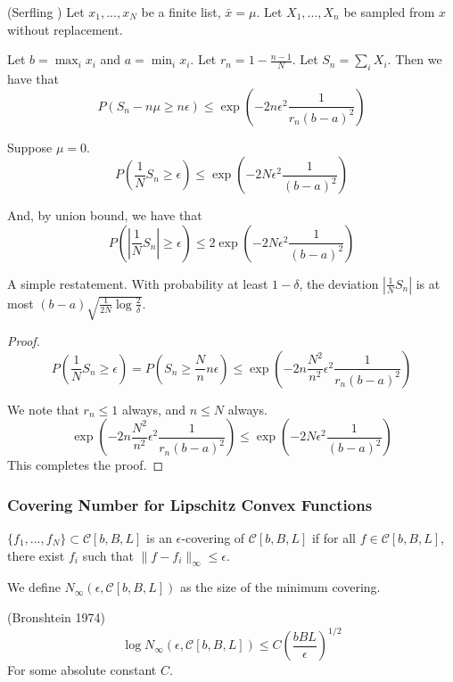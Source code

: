 \begin{lemma} (Serfling \cite{serfling1974probability}) 
Let $x_1,..., x_N$ be a finite list, $\bar{x} = \mu$. Let $X_1,...,X_n$ be sampled from $x$ without replacement. 

Let $b = \max_i x_i$ and $a = \min_i x_i$. Let $r_n = 1- \frac{n-1}{N}$. Let $S_n = \sum_i X_i$.
Then we have that
\[
P( S_n - n \mu \geq n \epsilon) \leq \exp( - 2 n \epsilon^2 \frac{1}{r_n (b-a)^2})
\]
\end{lemma}

\begin{corollary}
\label{cor:serfling}
Suppose $\mu = 0$. 
\[
P( \frac{1}{N} S_n \geq \epsilon) \leq \exp( -2 N \epsilon^2 \frac{1}{(b-a)^2})
\]

And, by union bound, we have that
\[
P( | \frac{1}{N} S_n| \geq \epsilon) \leq 2 \exp( -2 N \epsilon^2 \frac{1}{(b-a)^2})
\]

\end{corollary}

A simple restatement. With probability at least $1- \delta$, the deviation $| \frac{1}{N} S_n|$ is at most $ (b-a) \sqrt{ \frac{1}{2N} \log \frac{2}{\delta}}$.

\begin{proof}
\[
P( \frac{1}{N} S_n \geq \epsilon) = P( S_n \geq \frac{N}{n} n \epsilon) \leq \exp( - 2 n \frac{N^2}{n^2} \epsilon^2 \frac{1}{r_n (b-a)^2} ) 
\]

We note that $r_n \leq 1$ always, and $n \leq N$ always. 
\[
\exp( - 2 n \frac{N^2}{n^2} \epsilon^2 \frac{1}{r_n (b-a)^2} )  \leq \exp( - 2 N \epsilon^2 \frac{1}{(b-a)^2})
\]
This completes the proof.

\end{proof}

\subsubsection{Covering Number for Lipschitz Convex Functions}

\begin{definition}
$\{ f_1,..., f_N\} \subset \mathcal{C}[b,B,L]$ is an $\epsilon$-covering of $\mathcal{C}[b,B,L]$ if for all $f \in \mathcal{C}[b,B,L]$, there exist $f_i$ such that $\| f - f_i \|_\infty \leq \epsilon$.

We define $N_\infty( \epsilon, \mathcal{C}[b,B,L])$ as the size of the minimum covering.
\end{definition}

\begin{lemma} (Bronshtein 1974)
\[
\log N_\infty (\epsilon, \mathcal{C}[b,B,L]) \leq C\left( \frac{bBL}{\epsilon} \right)^{1/2}
\]
For some absolute constant $C$.
\end{lemma}

